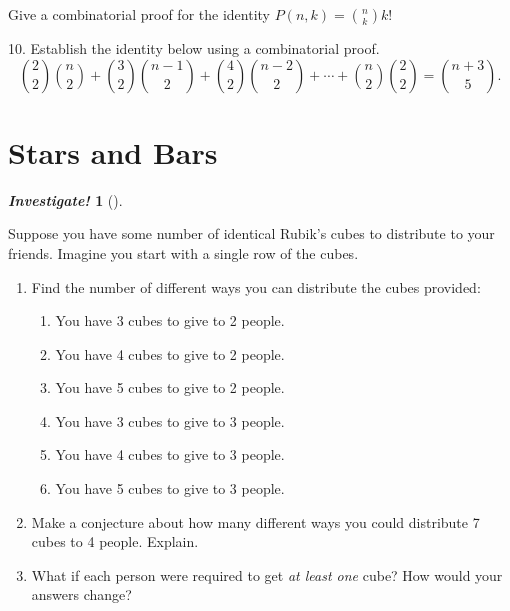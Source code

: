 \documentclass[10pt,]{book}
\theoremstyle{plain}
\theoremstyle{definition}
\theoremstyle{definition}
\newtheorem{investigation}[project]{\emph{Investigate!}}
\theoremstyle{definition}
\numberwithin{equation}{section}
\begin{document}
\begin{exerciselist}
          Give a combinatorial proof for the identity \(P(n,k) = {n \choose k}k!\)
\par\smallskip
\item[10.]\hypertarget{exercise-81}{}
          Establish the identity below using a combinatorial proof.
          \begin{equation*}
            {2 \choose 2}{n \choose 2} + {3 \choose 2}{n-1 \choose 2} + {4\choose 2}{n-2 \choose 2} + \cdots + {n\choose 2}{2\choose 2} = {n+3 \choose 5}.
          \end{equation*}
\par\smallskip
\end{exerciselist}
\typeout{************************************************}
\typeout{************************************************}
\section[Stars and Bars]{Stars and Bars}\label{sec_stars-and-bars}

%
\begin{investigation}[]\label{investigation-10}

  Suppose you have some number of identical Rubik's cubes to distribute to your friends. Imagine you start with a single row of the cubes.


\leavevmode%
\begin{enumerate}
\item\hypertarget{li-557}{}
 Find the number of different ways you can distribute the cubes provided:
%
%
\begin{enumerate}
\item\hypertarget{li-558}{}
You have 3 cubes to give to 2 people.
%
\item\hypertarget{li-559}{}
You have 4 cubes to give to 2 people.
%
\item\hypertarget{li-560}{}
You have 5 cubes to give to 2 people.
%
\item\hypertarget{li-561}{}
You have 3 cubes to give to 3 people.
%
\item\hypertarget{li-562}{}
You have 4 cubes to give to 3 people.
%
\item\hypertarget{li-563}{}
You have 5 cubes to give to 3 people.
%
\end{enumerate}
\item\hypertarget{li-564}{}
Make a conjecture about how many different ways you could distribute 7 cubes to 4 people. Explain.
%
\item\hypertarget{li-565}{}
What if each person were required to get \emph{at least one} cube? How would your answers change?
%
\end{enumerate}

%
\end{investigation}
\par
\end{document}
